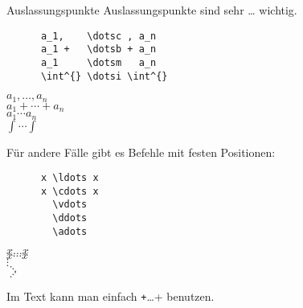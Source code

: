 \begin{frame}[fragile]{Auslassungspunkte}
  Auslassungspunkte sind sehr … wichtig.
  \begin{CodeExample}{0.5}
    \begin{verbatim}
      a_1,    \dotsc , a_n
      a_1 +   \dotsb + a_n
      a_1     \dotsm   a_n
      \int^{} \dotsi \int^{}
    \end{verbatim}
  \CodeResult
    \strut
    $a_1,    \dotsc , a_n$ \\
    $a_1 +   \dotsb + a_n$ \\
    $a_1     \dotsm   a_n$ \\
    $\int^{} \dotsi \int^{}$
  \end{CodeExample}

  Für andere Fälle gibt es Befehle mit festen Positionen:
  \begin{CodeExample}{0.5}
    \begin{verbatim}
      x \ldots x
      x \cdots x
        \vdots
        \ddots
        \adots
    \end{verbatim}
  \CodeResult
    \strut
    $x \ldots x$ \\
    $x \cdots x$ \\
    $\vdots$ \\
    $\ddots$ \\
    $\adots$
  \end{CodeExample}

  Im Text kann man einfach \texttt+\dots+ benutzen.
\end{frame}

